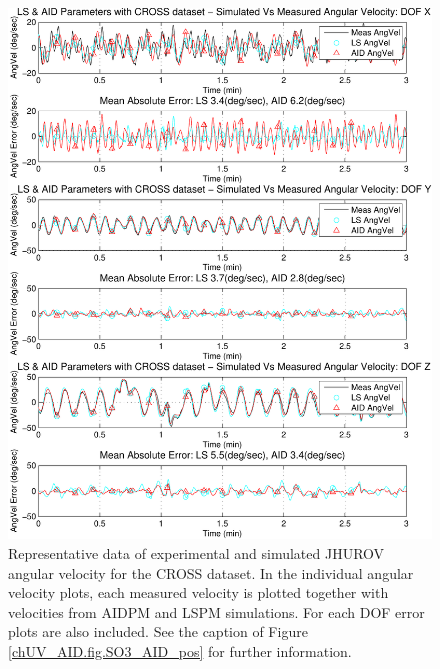 \begin{center}
\begin{figure}[htbp]
  \begin{center}
    \includegraphics[width=5.5in]{./chUV_AID/images/crossAID_vel}
  \end{center}
  \caption{ Representative data of experimental and simulated \ac{JHUROV}
    angular velocity for the \ac{CROSS} dataset. In the
    individual angular velocity plots, each measured velocity is
    plotted together with velocities from \ac{AIDPM} and \ac{LSPM}
    simulations.  For each \ac{DOF} error plots are also included. See the
    caption of Figure \ref{chUV_AID.fig.SO3_AID_pos} for further information.}
  \label{chUV_AID.fig.SO3_AID_vel}
\end{figure}
\end{center}


